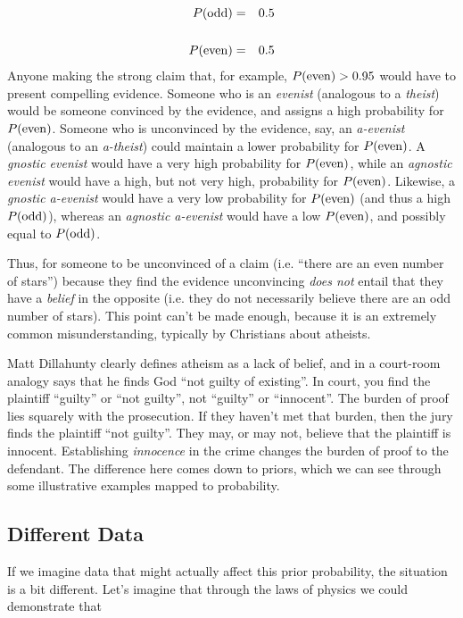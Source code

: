 \begin{eqnarray*}
P({\rm odd}) &=&0.5 \\\\
P({\rm even})&=&0.5
\end{eqnarray*}
Anyone making the strong claim that, for example, $P({\rm even})>0.95$ would have to present compelling evidence.  Someone who is an {\em evenist} (analogous to a {\em theist}) would be someone convinced by the evidence, and assigns a high probability for $P({\rm even})$.  Someone who is unconvinced by the evidence, say, an {\em a-evenist} (analogous to an {\em a-theist}) could maintain a lower probability for $P({\rm even})$.  A {\em gnostic evenist} would have a very high probability for $P({\rm even})$, while an {\em agnostic evenist} would have a high, but not very high, probability for $P({\rm even})$.  Likewise, a {\em gnostic a-evenist} would have a very low probability for $P({\rm even})$ (and thus a high $P({\rm odd})$), whereas an {\em agnostic a-evenist} would have a low $P({\rm even})$, and possibly equal to $P({\rm odd})$.  

Thus, for someone to be unconvinced of a claim (i.e. ``there are an even number of stars'') because they find the evidence unconvincing {\em does not} entail that they have a {\em belief} in the opposite (i.e. they do not necessarily believe there are an odd number of stars).  This point can't be made enough, because it is an extremely common misunderstanding, typically by Christians about atheists.

Matt Dillahunty clearly defines atheism as a lack of belief, and in a
court-room analogy says that he finds God ``not guilty of existing''. In
court, you find the plaintiff ``guilty'' or ``not guilty'', not
``guilty'' or ``innocent''. The burden of proof lies squarely with the
prosecution. If they haven't met that burden, then the jury finds the
plaintiff ``not guilty''. They may, or may not, believe that the
plaintiff is innocent. Establishing \emph{innocence} in the crime
changes the burden of proof to the defendant. The difference here comes
down to priors, which we can see through some illustrative examples
mapped to probability.

\subsection{Different Data}\label{different-data}

If we imagine data that might actually affect this prior probability,
the situation is a bit different. Let's imagine that through the laws of
physics we could demonstrate that

